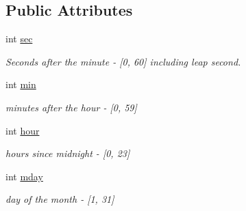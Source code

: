\subsection*{Public Attributes}
\begin{DoxyCompactItemize}
\item 
\mbox{\label{structlib_c_z_i_1_1_xml_date_time_ad6150dda14ef3c9dd3c7d8035e203add}} 
int \hyperlink{structlib_c_z_i_1_1_xml_date_time_ad6150dda14ef3c9dd3c7d8035e203add}{sec}
\begin{DoxyCompactList}\small\item\em Seconds after the minute -\/ \mbox{[}0, 60\mbox{]} including leap second. \end{DoxyCompactList}\item 
\mbox{\label{structlib_c_z_i_1_1_xml_date_time_ac050f3222783e2e118d82fa7d90ef195}} 
int \hyperlink{structlib_c_z_i_1_1_xml_date_time_ac050f3222783e2e118d82fa7d90ef195}{min}
\begin{DoxyCompactList}\small\item\em minutes after the hour -\/ \mbox{[}0, 59\mbox{]} \end{DoxyCompactList}\item 
\mbox{\label{structlib_c_z_i_1_1_xml_date_time_a2cdc652279c693a679fc677067f1555f}} 
int \hyperlink{structlib_c_z_i_1_1_xml_date_time_a2cdc652279c693a679fc677067f1555f}{hour}
\begin{DoxyCompactList}\small\item\em hours since midnight -\/ \mbox{[}0, 23\mbox{]} \end{DoxyCompactList}\item 
\mbox{\label{structlib_c_z_i_1_1_xml_date_time_ae7360fea53276bdf24eb96d788498397}} 
int \hyperlink{structlib_c_z_i_1_1_xml_date_time_ae7360fea53276bdf24eb96d788498397}{mday}
\begin{DoxyCompactList}\small\item\em day of the month -\/ \mbox{[}1, 31\mbox{]} \end{DoxyCompactList}\item 
\mbox{\label{structlib_c_z_i_1_1_xml_date_time_aa6dedc3005bf4d2fec428e8d3e27460c}} 

\end{DoxyCompactItemize}
